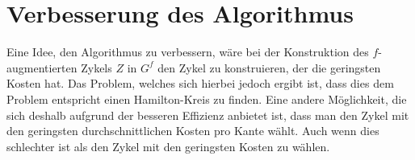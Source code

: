 \section{Verbesserung des Algorithmus}

Eine Idee, den Algorithmus zu verbessern, wäre bei der Konstruktion des $f$-augmentierten Zykels $Z$ in $G^f$ den Zykel zu konstruieren, der die geringsten Kosten hat. Das Problem, welches sich hierbei jedoch ergibt ist, dass dies dem Problem entspricht einen Hamilton-Kreis zu finden. Eine andere Möglichkeit, die sich deshalb aufgrund der besseren Effizienz anbietet ist, dass man den Zykel mit den geringsten durchschnittlichen Kosten pro Kante wählt. Auch wenn dies schlechter ist als den Zykel mit den geringsten Kosten zu wählen.